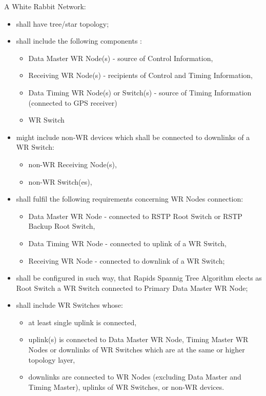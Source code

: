 A White Rabbit Network:
\begin{itemize}
  \item shall have tree/star topology;

  \item shall include the following components :
  \begin{itemize}
       \item  Data Master WR Node(s) - source of Control Information,
       \item  Receiving WR Node(s) - recipients of Control and Timing
	      Information,
       \item  Data Timing WR Node(s) or Switch(s) - source of Timing
	      Information (connected to GPS receiver)
       \item  WR Switch
  \end{itemize}

  \item might include non-WR devices which shall be connected to downlinks of a
	  WR Switch:
  \begin{itemize}
       \item  non-WR Receiving Node(s),
       \item  non-WR Switch(es),
  \end{itemize}

  \item shall fulfil the following requirements concerning WR Nodes connection:
  \begin{itemize}
       \item  Data Master WR Node - connected to RSTP Root Switch or RSTP
	      Backup Root Switch,
       \item  Data Timing WR Node - connected to uplink of a WR Switch,
       \item  Receiving WR Node - connected to downlink of a WR Switch;
  \end{itemize}
 
 \item shall be configured in such way, that Rapids Spannig Tree Algorithm
	elects as Root Switch a WR Switch connected to Primary Data Master WR
	Node; 

  \item shall include WR Switches whose:
  \begin{itemize}
        \item  at least single uplink is connected,
        \item  uplink(s) is connected to Data Master WR Node, Timing
		Master WR Nodes or downlinks of WR Switches which are at the
		same or higher topology layer,
        \item  downlinks are connected to WR Nodes (excluding Data Master and
		Timing Master), uplinks of WR Switches, or non-WR devices.
  \end{itemize}


\end{itemize}
